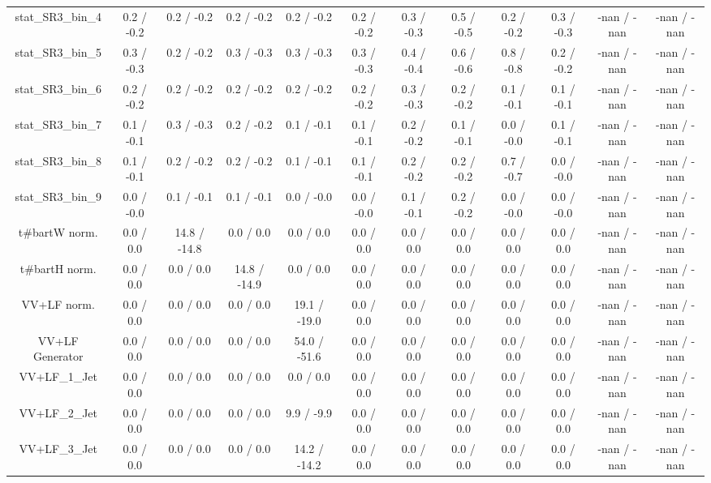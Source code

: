 \begin{table}[htbp]
\begin{center}
\begin{tabular}{|c|c|c|c|c|c|c|c|c|c|c|c|}
 stat_SR3_bin_4 & 0.2 / -0.2 & 0.2 / -0.2 & 0.2 / -0.2 & 0.2 / -0.2 & 0.2 / -0.2 & 0.3 / -0.3 & 0.5 / -0.5 & 0.2 / -0.2 & 0.3 / -0.3 & -nan / -nan & -nan / -nan \\ 
 stat_SR3_bin_5 & 0.3 / -0.3 & 0.2 / -0.2 & 0.3 / -0.3 & 0.3 / -0.3 & 0.3 / -0.3 & 0.4 / -0.4 & 0.6 / -0.6 & 0.8 / -0.8 & 0.2 / -0.2 & -nan / -nan & -nan / -nan \\ 
 stat_SR3_bin_6 & 0.2 / -0.2 & 0.2 / -0.2 & 0.2 / -0.2 & 0.2 / -0.2 & 0.2 / -0.2 & 0.3 / -0.3 & 0.2 / -0.2 & 0.1 / -0.1 & 0.1 / -0.1 & -nan / -nan & -nan / -nan \\ 
 stat_SR3_bin_7 & 0.1 / -0.1 & 0.3 / -0.3 & 0.2 / -0.2 & 0.1 / -0.1 & 0.1 / -0.1 & 0.2 / -0.2 & 0.1 / -0.1 & 0.0 / -0.0 & 0.1 / -0.1 & -nan / -nan & -nan / -nan \\ 
 stat_SR3_bin_8 & 0.1 / -0.1 & 0.2 / -0.2 & 0.2 / -0.2 & 0.1 / -0.1 & 0.1 / -0.1 & 0.2 / -0.2 & 0.2 / -0.2 & 0.7 / -0.7 & 0.0 / -0.0 & -nan / -nan & -nan / -nan \\ 
 stat_SR3_bin_9 & 0.0 / -0.0 & 0.1 / -0.1 & 0.1 / -0.1 & 0.0 / -0.0 & 0.0 / -0.0 & 0.1 / -0.1 & 0.2 / -0.2 & 0.0 / -0.0 & 0.0 / -0.0 & -nan / -nan & -nan / -nan \\ 
  t#bar{t}W norm. & 0.0 / 0.0 & 14.8 / -14.8 & 0.0 / 0.0 & 0.0 / 0.0 & 0.0 / 0.0 & 0.0 / 0.0 & 0.0 / 0.0 & 0.0 / 0.0 & 0.0 / 0.0 & -nan / -nan & -nan / -nan \\ 
  t#bar{t}H norm. & 0.0 / 0.0 & 0.0 / 0.0 & 14.8 / -14.9 & 0.0 / 0.0 & 0.0 / 0.0 & 0.0 / 0.0 & 0.0 / 0.0 & 0.0 / 0.0 & 0.0 / 0.0 & -nan / -nan & -nan / -nan \\ 
  VV+LF norm. & 0.0 / 0.0 & 0.0 / 0.0 & 0.0 / 0.0 & 19.1 / -19.0 & 0.0 / 0.0 & 0.0 / 0.0 & 0.0 / 0.0 & 0.0 / 0.0 & 0.0 / 0.0 & -nan / -nan & -nan / -nan \\ 
  VV+LF Generator & 0.0 / 0.0 & 0.0 / 0.0 & 0.0 / 0.0 & 54.0 / -51.6 & 0.0 / 0.0 & 0.0 / 0.0 & 0.0 / 0.0 & 0.0 / 0.0 & 0.0 / 0.0 & -nan / -nan & -nan / -nan \\ 
  VV+LF_1_Jet & 0.0 / 0.0 & 0.0 / 0.0 & 0.0 / 0.0 & 0.0 / 0.0 & 0.0 / 0.0 & 0.0 / 0.0 & 0.0 / 0.0 & 0.0 / 0.0 & 0.0 / 0.0 & -nan / -nan & -nan / -nan \\ 
  VV+LF_2_Jet & 0.0 / 0.0 & 0.0 / 0.0 & 0.0 / 0.0 & 9.9 / -9.9 & 0.0 / 0.0 & 0.0 / 0.0 & 0.0 / 0.0 & 0.0 / 0.0 & 0.0 / 0.0 & -nan / -nan & -nan / -nan \\ 
  VV+LF_3_Jet & 0.0 / 0.0 & 0.0 / 0.0 & 0.0 / 0.0 & 14.2 / -14.2 & 0.0 / 0.0 & 0.0 / 0.0 & 0.0 / 0.0 & 0.0 / 0.0 & 0.0 / 0.0 & -nan / -nan & -nan / -nan \\ 

\end{tabular}
\end{center}
\end{table}
